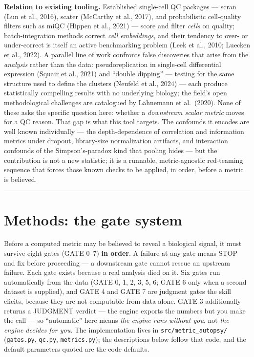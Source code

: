 \documentclass[
  11pt,
]{article}
\begin{document}
\textbf{Relation to existing tooling.} Established single-cell QC
packages --- scran (Lun et al., 2016), scater (McCarthy et al., 2017),
and probabilistic cell-quality filters such as miQC (Hippen et al.,
2021) --- score and filter \emph{cells} on quality; batch-integration
methods correct \emph{cell embeddings}, and their tendency to over- or
under-correct is itself an active benchmarking problem (Leek et al.,
2010; Luecken et al., 2022). A parallel line of work confronts false
discoveries that arise from the \emph{analysis} rather than the data:
pseudoreplication in single-cell differential expression (Squair et al.,
2021) and ``double dipping'' --- testing for the same structure used to
define the clusters (Neufeld et al., 2024) --- each produce
statistically compelling results with no underlying biology; the field's
open methodological challenges are catalogued by Lähnemann et
al.~(2020). None of these asks the specific question here: whether a
\emph{downstream scalar metric} moves for a QC reason. That gap is what
this tool targets. The confounds it encodes are well known individually
--- the depth-dependence of correlation and information metrics under
dropout, library-size normalization artifacts, and interaction confounds
of the Simpson's-paradox kind that pooling hides --- but the
contribution is not a new statistic; it is a runnable, metric-agnostic
red-teaming sequence that forces those known checks to be applied, in
order, before a metric is believed.

\begin{center}\rule{0.5\linewidth}{0.5pt}\end{center}

\section{Methods: the gate system}\label{methods-the-gate-system}

Before a computed metric may be believed to reveal a biological signal,
it must survive eight gates (GATE 0--7) \textbf{in order}. A failure at
any gate means STOP and fix before proceeding --- a downstream gate
cannot rescue an upstream failure. Each gate exists because a real
analysis died on it. Six gates run automatically from the data (GATE 0,
1, 2, 3, 5, 6; GATE 6 only when a second dataset is supplied), and GATE
4 and GATE 7 are judgment gates the skill elicits, because they are not
computable from data alone. GATE 3 additionally returns a JUDGMENT
verdict --- the engine exports the numbers but you make the call --- so
``automatic'' here means \emph{the engine runs without you}, not
\emph{the engine decides for you}. The implementation lives in
\texttt{src/metric\_autopsy/} (\texttt{gates.py}, \texttt{qc.py},
\texttt{metrics.py}); the descriptions below follow that code, and the
default parameters quoted are the code defaults.
\end{document}
